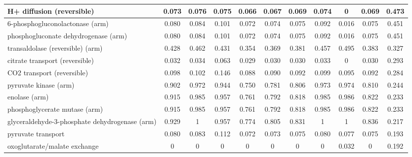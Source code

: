 \begin{longtable}{|l|c|c|c|c|c|c|c|c|c|c|}
H+ diffusion (reversible)                                  & 0.073     & 0.076     & 0.075    & 0.066             & 0.067 & 0.069  & 0.074         & 0      & 0.069    & 0.473 \\ \hline
6-phosphogluconolactonase (arm)                            & 0.080     & 0.084     & 0.101    & 0.072             & 0.074 & 0.075  & 0.092         & 0.016  & 0.075    & 0.451 \\ \hline
phosphogluconate dehydrogenase (arm)                       & 0.080     & 0.084     & 0.101    & 0.072             & 0.074 & 0.075  & 0.092         & 0.016  & 0.075    & 0.451 \\ \hline
transaldolase (reversible) (arm)                           & 0.428     & 0.462     & 0.431    & 0.354             & 0.369 & 0.381  & 0.457         & 0.495  & 0.383    & 0.327 \\ \hline
citrate transport (reversible)                             & 0.032     & 0.034     & 0.063    & 0.029             & 0.030 & 0.030  & 0.033         & 0      & 0.030    & 0.293 \\ \hline
CO2 transport (reversible)                                 & 0.098     & 0.102     & 0.146    & 0.088             & 0.090 & 0.092  & 0.099         & 0.095  & 0.092    & 0.284 \\ \hline
pyruvate kinase (arm)                                      & 0.902     & 0.972     & 0.944    & 0.750             & 0.781 & 0.806  & 0.973         & 0.974  & 0.810    & 0.244 \\ \hline
enolase (arm)                                              & 0.915     & 0.985     & 0.957    & 0.761             & 0.792 & 0.818  & 0.985         & 0.986  & 0.822    & 0.233 \\ \hline
phosphoglycerate mutase (arm)                              & 0.915     & 0.985     & 0.957    & 0.761             & 0.792 & 0.818  & 0.985         & 0.986  & 0.822    & 0.233 \\ \hline
glyceraldehyde-3-phosphate dehydrogenase (arm)             & 0.929     & 1         & 0.957    & 0.774             & 0.805 & 0.831  & 1             & 1      & 0.836    & 0.217 \\ \hline
pyruvate transport                                         & 0.080     & 0.083     & 0.112    & 0.072             & 0.073 & 0.075  & 0.080         & 0.077  & 0.075    & 0.193 \\ \hline
oxoglutarate/malate exchange                               & 0         & 0         & 0        & 0                 & 0     & 0      & 0             & 0.032  & 0        & 0.192 \\ \hline

\end{longtable}
